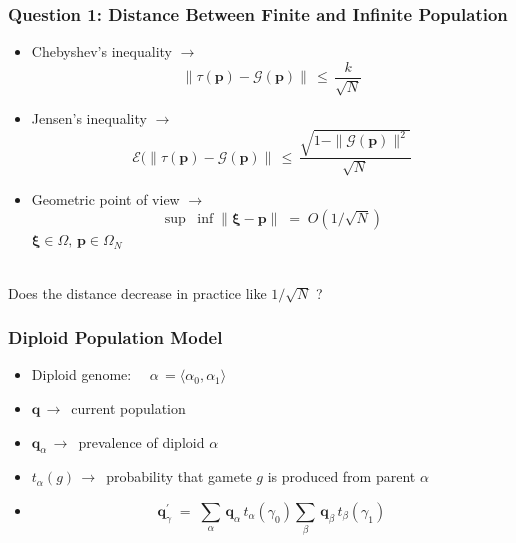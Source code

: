 \documentclass[aspectratio=169]{beamer}
\begin{document}
  
  \begin{frame}
    \frametitle{Question 1: Distance Between Finite and Infinite Population}
    \begin{itemize}
      \item{Chebyshev's inequality $\to$ \[ \| \tau (\bm{p}) - \mathcal{G}(\bm{p}) \| \,\leq\, \frac{k}{\sqrt{N}} \] }
      \item{Jensen's inequality  
      $\to$ \[ \mathcal{E}(\| \tau (\bm{p}) - \mathcal{G}(\bm{p}) \| \,\leq\, \frac{\sqrt{1 - \|\mathcal{G}(\bm{p})\|^2}}{\sqrt{N}}\]}
      \item{Geometric point of view $\to$ \[ \sup \; \inf \|\bm{\xi} - \bm{p}\| \;=\; O(1/\sqrt{N}) \] 
	$\bm{\xi} \in \Omega,\, \bm{p} \in \Omega_N$
      }      
    \end{itemize}
      \mbox{}\\[0.25 in]
    Does the distance decrease in practice like $1/\sqrt{N}$ ?
  \end{frame}
  
  \begin{frame}
    \frametitle{Diploid Population Model}
    \begin{itemize}
      \item{Diploid genome: $\quad \alpha \,= \langle \alpha_0, \alpha_1 \rangle$}
      \item{$\bm{q} \, \to \,$ current population} 
      \item{$\bm{q}_\alpha \, \to \,$ prevalence of diploid $\alpha$}
      \item{$t_\alpha(g) \, \to\,$ probability that gamete $g$ is produced from parent $\alpha$ }
      \item{\[\bm{q}_\gamma^{\prime} \; = \;
      \sum_{\alpha} \, \bm{q}_\alpha \, t_\alpha(\gamma_0) 
      \sum_{\beta} \,\bm{q}_\beta \, t_\beta(\gamma_1)\]}
    \end{itemize}
  \end{frame}
  
\end{document}
